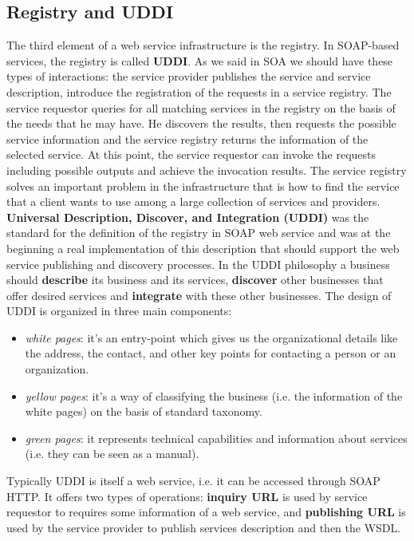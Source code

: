 \subsection{Registry and UDDI}
The third element of a web service infrastructure is the registry.
In SOAP-based services, the registry is called \textbf{UDDI}.
As we said in SOA we should have these types of interactions: the service provider publishes the service and service description, introduce the registration of the requests in a service registry.
The service requestor queries for all matching services in the registry on the basis of the needs that he may have.
He discovers the results, then requests the possible service information and the service registry returns the information of the selected service.
At this point, the service requestor can invoke the requests including possible outputs and achieve the invocation results.
The service registry solves an important problem in the infrastructure that is how to find the service that a client wants to use among a large collection of services and providers.
\newline\newline
\textbf{Universal Description, Discover, and Integration (UDDI)} was the standard for the definition of the registry in SOAP web service and was at the beginning a real implementation of this description that should support the web service publishing and discovery processes.
In the UDDI philosophy a business should \textbf{describe} its business and its services, \textbf{discover} other businesses that offer desired services and \textbf{integrate} with these other businesses.
The design of UDDI is organized in three main components:
\begin{itemize}
    \item \textit{white pages}: it's an entry-point which gives us the organizational details like the address, the contact, and other key points for contacting a person or an organization.
    \item \textit{yellow pages}: it's a way of classifying the business (i.e. the information of the white pages) on the basis of standard taxonomy.
    \item \textit{green pages}: it represents technical capabilities and information about services (i.e. they can be seen as a manual).
\end{itemize}
Typically UDDI is itself a web service, i.e. it can be accessed through SOAP HTTP.
It offers two types of operations: \textbf{inquiry URL} is used by service requestor to requires some information of a web service, and \textbf{publishing URL} is used by the service provider to publish services description and then the WSDL.
